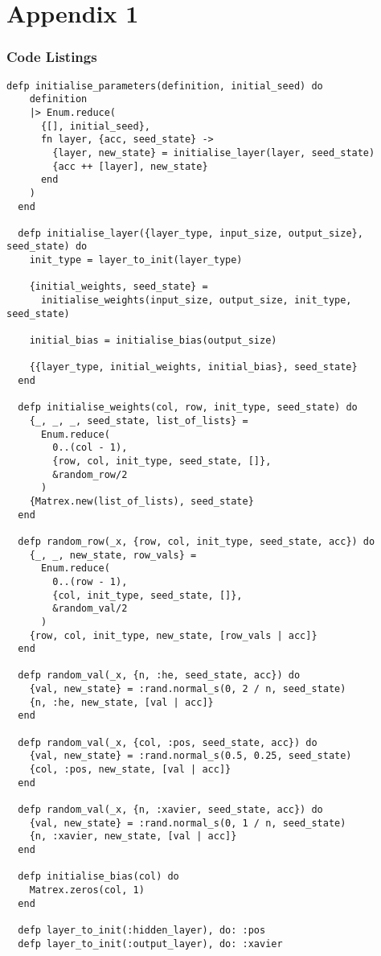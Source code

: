 \section{Appendix 1}
\subsubsection{Code Listings}
\begin{lstlisting}[caption={Network Initialisation}, label={network_initialisation}]
  defp initialise_parameters(definition, initial_seed) do
    definition
    |> Enum.reduce(
      {[], initial_seed},
      fn layer, {acc, seed_state} ->
        {layer, new_state} = initialise_layer(layer, seed_state)
        {acc ++ [layer], new_state}
      end
    )
  end

  defp initialise_layer({layer_type, input_size, output_size}, seed_state) do
    init_type = layer_to_init(layer_type)

    {initial_weights, seed_state} =
      initialise_weights(input_size, output_size, init_type, seed_state)

    initial_bias = initialise_bias(output_size)

    {{layer_type, initial_weights, initial_bias}, seed_state}
  end

  defp initialise_weights(col, row, init_type, seed_state) do
    {_, _, _, seed_state, list_of_lists} =
      Enum.reduce(
        0..(col - 1),
        {row, col, init_type, seed_state, []},
        &random_row/2
      )
    {Matrex.new(list_of_lists), seed_state}
  end

  defp random_row(_x, {row, col, init_type, seed_state, acc}) do
    {_, _, new_state, row_vals} =
      Enum.reduce(
        0..(row - 1),
        {col, init_type, seed_state, []},
        &random_val/2
      )
    {row, col, init_type, new_state, [row_vals | acc]}
  end

  defp random_val(_x, {n, :he, seed_state, acc}) do
    {val, new_state} = :rand.normal_s(0, 2 / n, seed_state)
    {n, :he, new_state, [val | acc]}
  end

  defp random_val(_x, {col, :pos, seed_state, acc}) do
    {val, new_state} = :rand.normal_s(0.5, 0.25, seed_state)
    {col, :pos, new_state, [val | acc]}
  end

  defp random_val(_x, {n, :xavier, seed_state, acc}) do
    {val, new_state} = :rand.normal_s(0, 1 / n, seed_state)
    {n, :xavier, new_state, [val | acc]}
  end

  defp initialise_bias(col) do
    Matrex.zeros(col, 1)
  end

  defp layer_to_init(:hidden_layer), do: :pos
  defp layer_to_init(:output_layer), do: :xavier
  \end{lstlisting}
